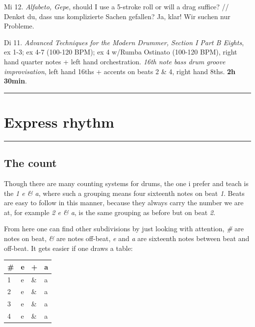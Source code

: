 \documentclass[
]{book}
\begin{document}
Mi 12. \emph{Alfabeto, Gepe}, should I use a 5-stroke roll or will a drag suffice? // Denkst du, dass uns komplizierte Sachen gefallen? Ja, klar! Wir suchen nur Probleme.

Di 11. \emph{Advanced Techniques for the Modern Drummer, Section I Part B Eights}, ex 1-3; ex 4-7 (100-120 BPM); ex 4 w/Rumba Ostinato (100-120 BPM), right hand quarter notes + left hand orchestration. \emph{16th note bass drum groove improvisation}, left hand 16ths + accents on beats 2 \& 4, right hand 8ths. \textbf{2h 30min}.

\hypertarget{okt112022}{}

\begin{center}\rule{0.5\linewidth}{0.5pt}\end{center}

\hypertarget{Express-rhythm}{%
\chapter{Express rhythm}\label{Express-rhythm}}

\begin{center}\rule{0.5\linewidth}{0.5pt}\end{center}

\hypertarget{the-count}{%
\section*{The count}\label{the-count}}

Though there are many counting systems for drums, the one i prefer and teach is the \emph{1 e \& a}, where such a grouping means four sixteenth notes on beat \emph{1}. Beats are easy to follow in this manner, because they always carry the number we are at, for example \emph{2 e \& a}, is the same grouping as before but on beat \emph{2}.

From here one can find other subdivisions by just looking with attention, \emph{\#} are notes on beat, \emph{\&} are notes off-beat, \emph{e} and \emph{a} are sixteenth notes between beat and off-beat. It gets easier if one draws a table:

\begin{longtable}[]{@{}llll@{}}
\toprule
\# & e & + & a \\
\midrule
\endhead
1 & e & \& & a \\
2 & e & \& & a \\
3 & e & \& & a \\
4 & e & \& & a \\
\bottomrule
\end{longtable}
\end{document}
